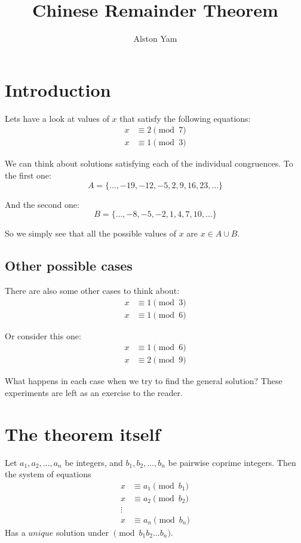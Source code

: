 \documentclass{article}
\title{Chinese Remainder Theorem}
\author{Alston Yam}
\date{}
\theoremstyle{mytheoremstyle}
\theoremstyle{mytheoremstyle}
\theoremstyle{myproblemstyle}
\begin{document}
    \maketitle

    \section{Introduction}
    Lets have a look at values of $x$ that satisfy the following equations:
    \begin{align*}
        x &\equiv 2 \pmod{7} \\
        x &\equiv 1 \pmod{3}
    \end{align*}

    We can think about solutions satisfying each of the individual congruences. To the first one: 
    \[A = \{\ldots, -19, -12, -5, 2, 9, 16, 23, \ldots\}\]

    And the second one:
    \[B = \{\ldots, -8, -5, -2, 1, 4, 7, 10, \ldots\}\]

    So we simply see that all the possible values of $x$ are $x \in A \cup B$.

    \subsection{Other possible cases}
    There are also some other cases to think about: 
    \begin{align*}
        x &\equiv 1 \pmod{3} \\
        x &\equiv 1 \pmod{6}
    \end{align*}

    Or consider this one:
    \begin{align*}
        x &\equiv 1 \pmod{6} \\
        x &\equiv 2 \pmod{9}
    \end{align*}

    What happens in each case when we try to find the general solution? These experiments are left as an exercise to the reader. 
    \pagebreak


    \section{The theorem itself}
    \begin{theorem}
        Let $a_1, a_2, \ldots, a_n$ be integers, and $b_1, b_2, \ldots, b_n$ be pairwise coprime integers. Then the system of equations
        \begin{align*}
            x &\equiv a_1 \pmod{b_1} \\
            x &\equiv a_2 \pmod{b_2} \\
            \vdots \\
            x &\equiv a_n \pmod{b_n}
        \end{align*}
        Has a $\textit{unique}$ solution under $\pmod{b_1b_2 \ldots b_n}$.
    \end{theorem}
\end{document}
